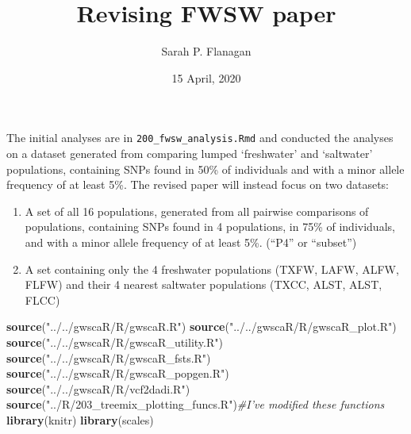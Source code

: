 \documentclass[]{article}
\title{Revising FWSW paper}
\author{Sarah P. Flanagan}
\date{15 April, 2020}
\newenvironment{Shaded}{\begin{snugshade}}{\end{snugshade}}
\newcommand{\KeywordTok}[1]{\textcolor[rgb]{0.13,0.29,0.53}{\textbf{#1}}}
\newcommand{\StringTok}[1]{\textcolor[rgb]{0.31,0.60,0.02}{#1}}
\newcommand{\CommentTok}[1]{\textcolor[rgb]{0.56,0.35,0.01}{\textit{#1}}}
\newcommand{\NormalTok}[1]{#1}
\providecommand{\tightlist}{%
  \setlength{\itemsep}{0pt}\setlength{\parskip}{0pt}}
\begin{document}
\maketitle

The initial analyses are in \texttt{200\_fwsw\_analysis.Rmd} and
conducted the analyses on a dataset generated from comparing lumped
`freshwater' and `saltwater' populations, containing SNPs found in 50\%
of individuals and with a minor allele frequency of at least 5\%. The
revised paper will instead focus on two datasets:

\begin{enumerate}
\def\labelenumi{\arabic{enumi}.}
\tightlist
\item
  A set of all 16 populations, generated from all pairwise comparisons
  of populations, containing SNPs found in 4 populations, in 75\% of
  individuals, and with a minor allele frequency of at least 5\%.
  (``P4'' or ``subset'')
\item
  A set containing only the 4 freshwater populations (TXFW, LAFW, ALFW,
  FLFW) and their 4 nearest saltwater populations (TXCC, ALST, ALST,
  FLCC)
\end{enumerate}

\begin{Shaded}
\begin{Highlighting}[]
\KeywordTok{source}\NormalTok{(}\StringTok{"../../gwscaR/R/gwscaR.R"}\NormalTok{)}
\KeywordTok{source}\NormalTok{(}\StringTok{"../../gwscaR/R/gwscaR_plot.R"}\NormalTok{)}
\KeywordTok{source}\NormalTok{(}\StringTok{"../../gwscaR/R/gwscaR_utility.R"}\NormalTok{)}
\KeywordTok{source}\NormalTok{(}\StringTok{"../../gwscaR/R/gwscaR_fsts.R"}\NormalTok{)}
\KeywordTok{source}\NormalTok{(}\StringTok{"../../gwscaR/R/gwscaR_popgen.R"}\NormalTok{)}
\KeywordTok{source}\NormalTok{(}\StringTok{"../../gwscaR/R/vcf2dadi.R"}\NormalTok{)}
\KeywordTok{source}\NormalTok{(}\StringTok{"../R/203_treemix_plotting_funcs.R"}\NormalTok{)}\CommentTok{#I've modified these functions}
\KeywordTok{library}\NormalTok{(knitr)}
\KeywordTok{library}\NormalTok{(scales)}
\end{Highlighting}
\end{Shaded}
\end{document}
